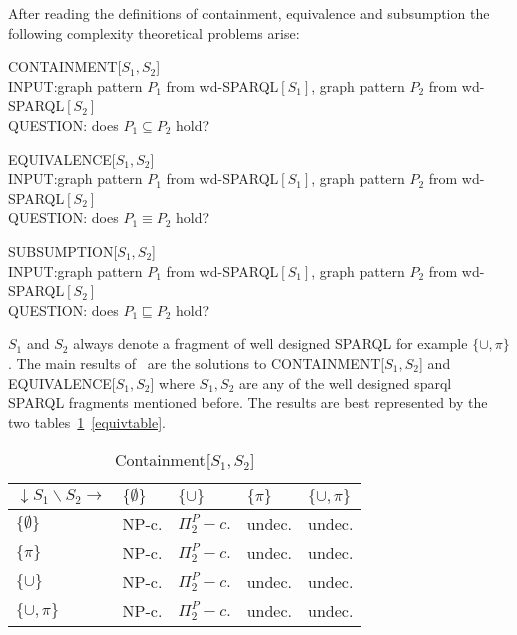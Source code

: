 \noindent After reading the definitions of containment, equivalence and
subsumption the following complexity theoretical problems arise:\\
\begin{framed}\noindent CONTAINMENT[$S_1,S_2$]\\
	INPUT:\quad graph pattern $P_1$ from wd-SPARQL$[S_1]$,
		 graph pattern $P_2$ from wd-SPARQL$[S_2]$\\
	QUESTION:  does $P_1 \subseteq P_2$ hold?
\end{framed}
\begin{framed}\noindent EQUIVALENCE[$S_1,S_2$]\\
	INPUT:\quad graph pattern $P_1$ from wd-SPARQL$[S_1]$,
		 graph pattern $P_2$ from wd-SPARQL$[S_2]$\\
	QUESTION:  does $P_1 \equiv P_2$ hold?
\end{framed}
\begin{framed}\noindent SUBSUMPTION[$S_1,S_2$]\\
	INPUT:\quad graph pattern $P_1$ from wd-SPARQL$[S_1]$,
		 graph pattern $P_2$ from wd-SPARQL$[S_2]$\\
	QUESTION:  does $P_1 \sqsubseteq P_2$ hold?
\end{framed}
$S_1$ and $S_2$ always denote a fragment of well designed SPARQL for example
$\{\cup,\pi\}$. The main results of~\cite{pichler2014containment} are the
solutions to CONTAINMENT[$S_1,S_2$] and EQUIVALENCE[$S_1,S_2$] where $S_1,S_2$
are any of the well designed sparql SPARQL fragments mentioned before.
The results are best represented by the two
tables~\ref{conttable}~\ref{equivtable}.
\begin{table}[!ht]\label{conttable}
\begin{tabular}{|l | l | l | l | l|}
	\hline
	$\downarrow S_1 \backslash S_2 \rightarrow$ & $\{\emptyset\}$  &
	$\{\cup\}$& $\{\pi \}$ & $\{\cup,\pi \}$ \\
	\hline
	$\{\emptyset\}$           & NP-c.	& $\Pi^P_2-c.$  & undec. & undec. \\
	$\{\pi \}$       & NP-c.	& $\Pi^P_2-c.$  & undec. & undec. \\
	$\{\cup \}$      & NP-c.	& $\Pi^P_2-c.$  & undec. & undec. \\
	$\{\cup,\pi \}$ & NP-c.	& $\Pi^P_2-c.$  & undec. & undec. \\
\hline
\end{tabular}
\caption{Containment[$S_1,S_2$]}
\end{table}

